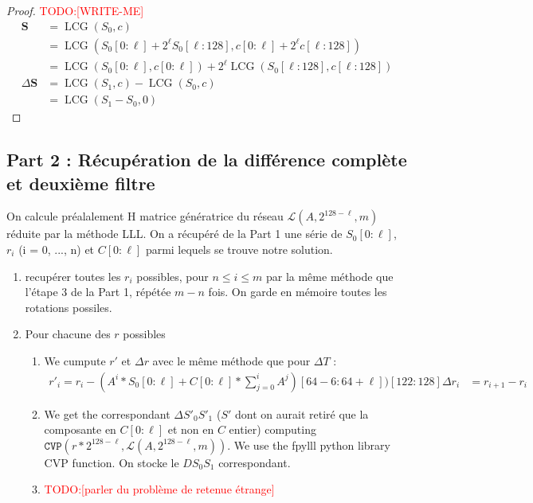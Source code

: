 \documentclass[preprint,svgnames]{iacrtrans}
\DeclareMathOperator{\LCG}{LCG}
\newcommand{\todo}[1]{\textcolor{red}{TODO:[#1]}}
\begin{document}
\begin{proof}
  \todo{WRITE-ME}
  \begin{align*}
  \mathbf{S} &= \LCG(S_0, c) \\
             &= \LCG\left(S_0[0:\ell] + 2^\ell S_0[\ell:128], c[0:\ell] + 2^\ell c[\ell:128]\right) \\
             &= \LCG\left(S_0[0:\ell], c[0:\ell]\right) + 2^\ell \LCG\left(S_0[\ell:128],  c[\ell:128]\right) \\
  \Delta \mathbf{S} &= \LCG(S_1, c) - \LCG(S_0, c) \\
             &= \LCG(S_1 - S_0, 0)
\end{align*}
\end{proof}


\subsection{Part 2 : Récupération de la différence complète et deuxième filtre}
On calcule préalalement H matrice génératrice du réseau $\mathcal{L}(A,2^{128 - \ell},m)$ réduite par la méthode LLL.
On a récupéré de la Part 1 une série de $S_0[0 : \ell]$, $r_i$ (i = 0, ..., n) et $C[0 : \ell]$ parmi lequels se trouve notre solution.
\begin{enumerate}
  \item recupérer toutes les $r_i$ possibles, pour $n \leq i \leq m$  par la même méthode que l'étape 3 de la Part 1, répétée $m-n$ fois. On garde en mémoire toutes les rotations possiles.
  \item Pour chacune des $r$ possibles
  \begin{enumerate}
    \item We cumpute $r'$ et $\Delta r$ avec le même méthode que pour $\Delta T$ : 
    \begin{align}
      r'_i = r_i - (A^i*S_0[0 : \ell] + C[0 : \ell] * \sum_{j = 0}^i A^j)[64 - 6 : 64 + \ell])[122 : 128]
      \Delta r_i &= r_{i+1} - r_i
    \end{align}

    \item We get the correspondant $\Delta S'_0S'_1$ ($S'$ dont on aurait retiré que la composante en $C[0 : \ell]$ et non en $C$ entier) computing $\texttt{CVP}(r * 2^{128 - \ell}, \mathcal{L}(A,2^{128 - \ell},m))$. We use the fpylll python library CVP function. On stocke le $DS_0S_1$ correspondant.

    \item \todo{parler du problème de retenue étrange}
    
  \end{enumerate}
\end{enumerate}
\end{document}
